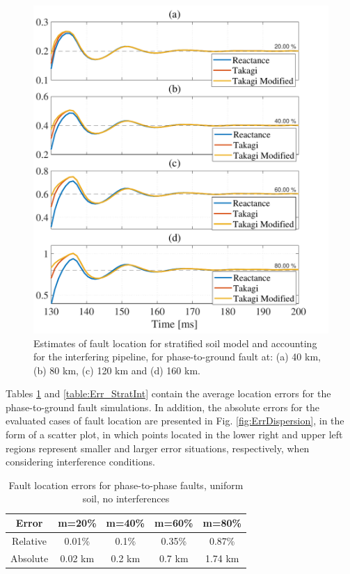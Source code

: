\documentclass[conference]{IEEEtran}
\begin{document}
\begin{figure}[hbt]
	\begin{center}
		\includegraphics[width=1.1\columnwidth]{./fig/FaultInterf.pdf}
		\caption{Estimates of fault location for stratified soil model and accounting for the interfering pipeline, for phase-to-ground fault at: (a) 40 km, (b) 80 km, (c) 120 km and (d) 160 km.}
		\label{fig:Conv_StratWithInterf}
	\end{center}
\end{figure}

Tables \ref{table:Err_UnifNoInt} and \ref{table:Err_StratInt} contain the average location errors for the phase-to-ground fault simulations. In addition, the absolute errors for the evaluated cases of fault location are presented in Fig. \ref{fig:ErrDispersion}, in the form of a scatter plot, in which points located in the lower right and upper left regions represent smaller and larger error situations, respectively, when considering interference conditions.

\begin{table}[!hbt]
	\renewcommand{\arraystretch}{1.3}
	\caption{Fault location errors for phase-to-phase faults, uniform soil, no interferences}
	\label{table:Err_UnifNoInt}
	\centering
	\begin{tabular}{|c|c|c|c|c|}
		\hline
		\textbf{Error} & \textbf{m=20\%} & \textbf{m=40\%} & \textbf{m=60\%} & \textbf{m=80\%}\\
		\hline
		Relative & 0.01\% & 0.1\%  & 0.35\%  & 0.87\%\\
		\hline
		Absolute & 0.02 km & 0.2 km & 0.7 km & 1.74 km\\
		\hline
	\end{tabular}
\end{table}
\end{document}
